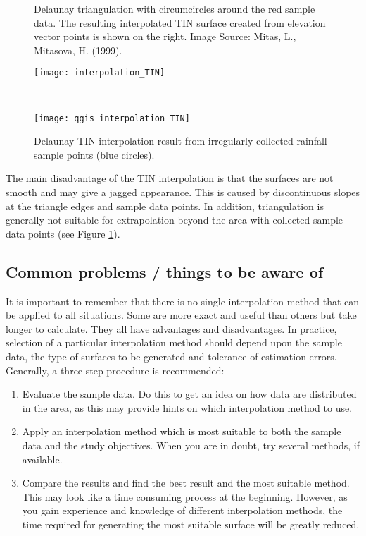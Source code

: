 \begin{figure}[htpb]
   \begin{minipage}[h]{\textwidth}
   \begin{center}
   \caption{Delaunay triangulation with circumcircles around the red sample
data. The resulting interpolated TIN surface created from elevation vector
points is shown on the right. Image Source: Mitas, L., Mitasova, H. (1999).}
   \label{fig:tin}\smallskip
   \texttt{[image: interpolation\_TIN]}
   \end{center}
   \end{minipage} \\
   \vspace{1cm}
   \begin{minipage}[h]{\textwidth}
   \begin{center}
   \caption{Delaunay TIN interpolation result from irregularly collected
rainfall sample points (blue circles).}
   \label{fig:qgistin}\smallskip
   \texttt{[image: qgis\_interpolation\_TIN]}
   \end{center}
   \end{minipage}
\end{figure}

The main disadvantage of the TIN interpolation is that the surfaces are not
smooth and may give a jagged appearance. This is caused by discontinuous
slopes at the triangle edges and sample data points. In addition,
triangulation is generally not suitable for extrapolation beyond the area
with collected sample data points (see Figure \ref{fig:qgistin}).

\subsection{Common problems / things to be aware of}

It is important to remember that there is no single interpolation method that
can be applied to all situations. Some are more exact and useful than others
but take longer to calculate. They all have advantages and disadvantages. In
practice, selection of a particular interpolation method should depend upon
the sample data, the type of surfaces to be generated and tolerance of
estimation errors. Generally, a three step procedure is recommended:

\begin{enumerate}
\item Evaluate the sample data. Do this to get an idea on how data are
distributed in the area, as this may provide hints on which interpolation
method to use. 
\item Apply an interpolation method which is most suitable to both the sample
data and the study objectives. When you are in doubt, try several methods, if
available. 
\item Compare the results and find the best result and the most suitable method.
This may look like a time consuming process at the beginning. However, as you
gain experience and knowledge of different interpolation methods, the time
required for generating the most suitable surface will be greatly reduced. 
\end{enumerate}

